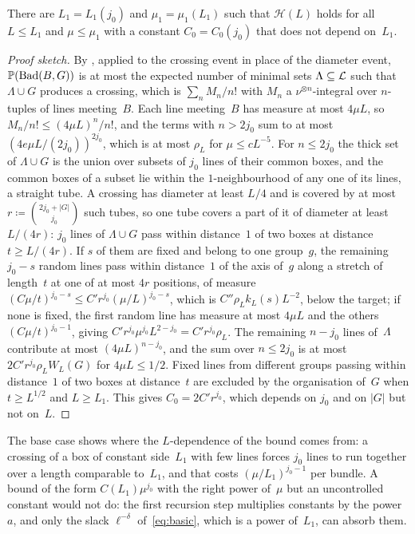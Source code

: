\documentclass[11pt,letterpaper]{article}
\newcommand{\Bad}{\mathrm{Bad}}
\begin{document}
\begin{lemma}
\label{lem:base}
There are $L_1=L_1(j_0)$ and $\mu_1=\mu_1(L_1)$ such that $\mathcal H(L)$ holds for all $L\le L_1$ and $\mu\le\mu_1$ with a constant $C_0=C_0(j_0)$ that does not depend on~$L_1$.
\end{lemma}

\begin{proof}[Proof sketch]
By \cite[Proposition~6.2]{DEC26}, applied to the crossing event in place of the diameter event, $\P(\Bad(B,G))$ is at most the expected number of minimal sets $\Lambda\subseteq\mathcal L$ such that $\Lambda\cup G$ produces a crossing, which is $\sum_n M_n/n!$ with $M_n$ a $\nu^{\otimes n}$-integral over $n$-tuples of lines meeting~$B$. Each line meeting~$B$ has measure at most $4\mu L$, so $M_n/n!\le(4\mu L)^n/n!$, and the terms with $n>2j_0$ sum to at most $(4e\mu L/(2j_0))^{2j_0}$, which is at most $\rho_L$ for $\mu\le cL^{-5}$. For $n\le2j_0$ the thick set of $\Lambda\cup G$ is the union over subsets of $j_0$ lines of their common boxes, and the common boxes of a subset lie within the $1$-neighbourhood of any one of its lines, a straight tube. A crossing has diameter at least $L/4$ and is covered by at most $r\coloneqq\binom{2j_0+\lvert G\rvert}{j_0}$ such tubes, so one tube covers a part of it of diameter at least $L/(4r)$: $j_0$ lines of $\Lambda\cup G$ pass within distance~$1$ of two boxes at distance $t\ge L/(4r)$. If $s$ of them are fixed and belong to one group~$g$, the remaining $j_0-s$ random lines pass within distance~$1$ of the axis of~$g$ along a stretch of length~$t$ at one of at most $4r$ positions, of measure $(C\mu/t)^{j_0-s}\le C'r^{j_0}(\mu/L)^{j_0-s}$, which is $C''\rho_Lk_L(s)L^{-2}$, below the target; if none is fixed, the first random line has measure at most $4\mu L$ and the others $(C\mu/t)^{j_0-1}$, giving $C'r^{j_0}\mu^{j_0}L^{2-j_0}=C'r^{j_0}\rho_L$. The remaining $n-j_0$ lines of~$\Lambda$ contribute at most $(4\mu L)^{n-j_0}$, and the sum over $n\le2j_0$ is at most $2C'r^{j_0}\rho_L W_L(G)$ for $4\mu L\le1/2$. Fixed lines from different groups passing within distance~$1$ of two boxes at distance~$t$ are excluded by the organisation of~$G$ when $t\ge L^{1/2}$ and $L\ge L_1$. This gives $C_0=2C'r^{j_0}$, which depends on $j_0$ and on $\lvert G\rvert$ but not on~$L$.
\end{proof}

The base case shows where the $L$-dependence of the bound comes from: a crossing of a box of constant side~$L_1$ with few lines forces $j_0$ lines to run together over a length comparable to~$L_1$, and that costs $(\mu/L_1)^{j_0-1}$ per bundle. A bound of the form $C(L_1)\mu^{j_0}$ with the right power of~$\mu$ but an uncontrolled constant would not do: the first recursion step multiplies constants by the power~$a$, and only the slack $\ell^{-\delta}$ of~\eqref{eq:basic}, which is a power of~$L_1$, can absorb them.
\end{document}
